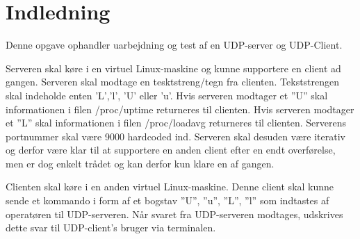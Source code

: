 \chapter{Indledning}\label{ch:introduction}
Denne opgave ophandler uarbejdning og test af en UDP-server og UDP-Client. 

Serveren skal køre i en virtuel Linux-maskine og kunne supportere en client ad gangen. Serveren skal modtage en tesktstreng/tegn fra clienten. Tekststrengen skal indeholde enten 'L','l', 'U' eller 'u'. Hvis serveren modtager et ”U” skal informationen i filen /proc/uptime
returneres til clienten. 
Hvis serveren modtager et ”L” skal informationen i filen /proc/loadavg returneres til clienten.
Serverens portnummer skal være 9000 hardcoded ind. 
Serveren skal desuden være iterativ og derfor være klar til at supportere en anden client efter en endt overførelse, men er dog enkelt trådet og kan derfor kun klare en af gangen.

Clienten skal køre i en anden virtuel Linux-maskine. Denne client skal kunne sende et kommando i form af et 
bogstav ”U”, ”u”, ”L”, ”l” som indtastes af operatøren
til UDP-serveren. Når svaret fra UDP-serveren modtages, udskrives dette svar til UDP-client’s bruger via terminalen.  
